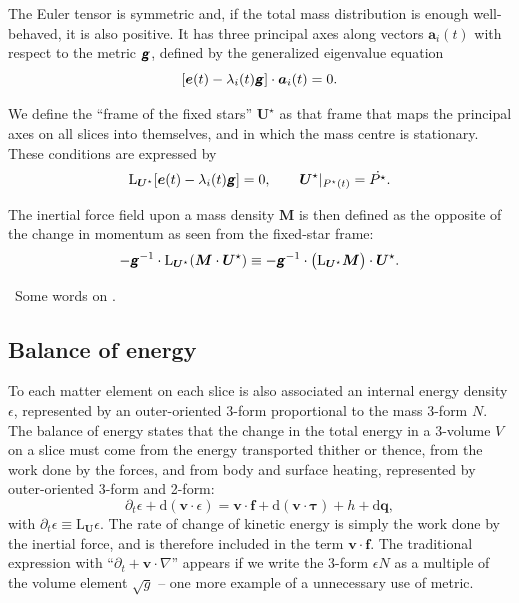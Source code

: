 \documentclass[\ifafour a4paper,12pt,\else a5paper,10pt,\fi%
onecolumn,oneside,article,%
british%
]{memoir}
\theoremstyle{remark}
\theoremstyle{innote}
\newcommand*{\mathte}[1]{\textbf{\textit{\textsf{#1}}}}
\newcommand*{\de}{\partialup}%
\newcommand*{\di}{\mathrm{d}}%
\renewcommand*{\|}[1][]{\nonscript\,#1\vert\nonscript\;\mathopen{}}
\newcommand*{\wrench}{{\fontencoding{U}\fontfamily{fontawesomethree}\selectfont\symbol{114}}}
\newcommand{\mynote}[1]{ {\color{notecolour}\wrench\ #1}}
\newcommand*{\Li}{\mathrm{L}}
\newcommand*{\yd}{N}
\newcommand*{\yrr}{M}
\newcommand*{\yr}{\bm{\yrr}}
\newcommand*{\yP}{P}
\newcommand*{\yPc}{\yP^{\mathord{\star}}}
\newcommand*{\yeu}{\bm{e}}
\newcommand*{\yva}{\bm{a}}
\newcommand*{\yla}{\lambda}
\newcommand*{\yQ}{h}
\newcommand*{\yqq}{q}
\newcommand*{\yq}{\bm{\yqq}}
\newcommand*{\yTT}{\tau}
\newcommand*{\yT}{\bm{\yTT}}
\newcommand*{\ybb}{f}
\newcommand*{\yb}{\bm{\ybb}}
\newcommand*{\yvvt}{v}
\newcommand*{\yvt}{\bm{\yvvt}}
\newcommand*{\yFF}{U}
\newcommand*{\yF}{\bm{\yFF}}
\newcommand*{\yFi}{\yF^{\mathord{\star}}}
\newcommand*{\ygg}{g}
\newcommand*{\yg}{\mathte{\ygg}}
\newcommand*{\ygv}{\sqrt{\ygg}}
\newcommand*{\ye}{\epsilon}
\newcommand*{\ynab}{\nabla}
\newcommand*{\yvo}{V}
\begin{document}
The Euler tensor is symmetric and, if the total mass distribution is enough
well-behaved, it is also positive. It has three principal axes along
vectors $\yva_i(t)$ with respect to the metric $\yg$, defined by the
generalized eigenvalue equation
\begin{equation}
  \label{eq:principal_axes_euler}
  [\yeu(t) - \yla_i(t) \yg] \cdot \yva_i(t) = 0.
\end{equation}

We define the \enquote{frame of the fixed stars} $\yFi$ as that frame that maps
the principal axes on all slices into themselves, and in which the mass
centre is stationary. These conditions are expressed by
\begin{equation}
  \label{eq:defin_fixed-star_frame}
  \Li_{\yFi}[\yeu(t) - \yla_i(t) \yg]=0,\qquad
  \yFi\rvert_{\yPc(t)}=\Dot{\yPc}.
\end{equation}

The inertial force field upon a mass density $\yr$ is then defined as the
opposite of the change in momentum as seen from the fixed-star frame:
\begin{equation}
  \label{eq:inertial_force_fixed-stars}
  -\yg^{-1} \cdot \Li_{\yFi}(\yr\cdot\yFi) \equiv
  -\yg^{-1} \cdot \bigl(\Li_{\yFi}\yr\bigr)\cdot\yFi.
\end{equation}

\mynote{Some words on \textcite{weatherall2017}.}



\subsection{Balance of energy}
\label{sec:energy_balance}

To each matter element on each slice is also associated an internal energy
density $\ye$, represented by an outer-oriented 3-form proportional to
the mass 3-form $\yd$. The balance of energy states that the change in the
total energy in a 3-volume $\yvo$ on a slice must come from the energy
transported thither or thence, from the work done by the forces, and from
body and surface heating, represented by outer-oriented 3-form and 2-form:
\begin{equation}
  \label{eq:balance_energy_traditional}
  \de_t\ye + \di(\yvt \cdot \ye) =
  \yvt\cdot\yb + \di(\yvt\cdot \yT)
  +\yQ + \di\yq,
\end{equation}
with $\de_t\ye \equiv \Li_{\yF}\ye$. The rate of change of
kinetic energy is simply the work done by the inertial force, and is
therefore included in the term $\yvt \cdot \yb$. The traditional expression
with \enquote{$\de_t + \yvt\cdot\ynab$} appears if we write the 3-form
$\ye\yd$ as a multiple of the volume element $\ygv$ -- one more example of
a unnecessary use of metric.
\end{document}
